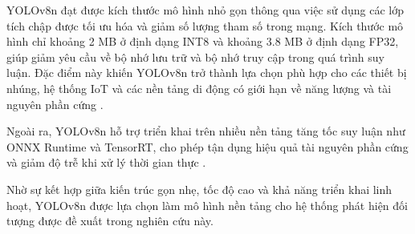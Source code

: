 YOLOv8n đạt được kích thước mô hình nhỏ gọn thông qua việc sử dụng các lớp
tích chập được tối ưu hóa và giảm số lượng tham số trong mạng. Kích thước mô
hình chỉ khoảng 2 MB ở định dạng INT8 và khoảng 3.8 MB ở định dạng FP32, giúp
giảm yêu cầu về bộ nhớ lưu trữ và bộ nhớ truy cập trong quá trình suy luận.
Đặc điểm này khiến YOLOv8n trở thành lựa chọn phù hợp cho các thiết bị nhúng,
hệ thống IoT và các nền tảng di động có giới hạn về năng lượng và tài nguyên
phần cứng \cite{yaseen2024yolov8}.

Ngoài ra, YOLOv8n hỗ trợ triển khai trên nhiều nền tảng tăng tốc suy luận như
ONNX Runtime và TensorRT, cho phép tận dụng hiệu quả tài nguyên phần cứng và
giảm độ trễ khi xử lý thời gian thực \cite{yaseen2024yolov8}.

Nhờ sự kết hợp giữa kiến trúc gọn nhẹ, tốc độ cao và khả năng triển khai linh
hoạt, YOLOv8n được lựa chọn làm mô hình nền tảng cho hệ thống phát hiện đối
tượng được đề xuất trong nghiên cứu này.
